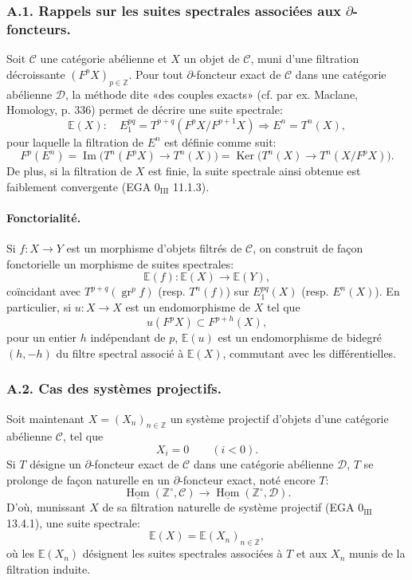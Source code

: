 \documentclass[11pt]{article}
\DeclareMathOperator{\Hom}{Hom}
\providecommand{\Ker}{\operatorname{Ker}}
\providecommand{\uHom}{\underline{\Hom}}
\providecommand{\gr}{\operatorname{gr}}
\providecommand{\Hom}{\operatorname{Hom}}
\providecommand{\Im}{\operatorname{Im}}
\providecommand{\Ker}{\operatorname{Ker}}
\providecommand{\gr}{\operatorname{gr}}
\renewcommand{\Im}{\operatorname{Im}}
\providecommand{\gr}{\operatorname{gr}}
\providecommand{\Ker}{\operatorname{Ker}}
\providecommand{\Im}{\operatorname{Im}}
\providecommand{\Hom}{\operatorname{Hom}}
\begin{document}
\subsubsection*{A.1. Rappels sur les suites spectrales associées aux \(\partial\)-foncteurs.}

Soit \(\mathcal C\) une catégorie abélienne et \(X\) un objet de \(\mathcal C\), muni d'une filtration décroissante \((F^pX)_{p\in\mathbb Z}\). Pour tout \(\partial\)-foncteur exact de \(\mathcal C\) dans une catégorie abélienne \(\mathcal D\), la méthode dite «des couples exacts» (cf. par ex. Maclane, Homology, p. 336) permet de décrire une suite spectrale:
\[
\mathbb{E}(X):\quad E_1^{pq}=T^{p+q}(F^pX/F^{p+1}X)\Rightarrow E^n=T^n(X),
\]
pour laquelle la filtration de \(E^n\) est définie comme suit:
\[
F^p(E^n)=\Im\bigl(T^n(F^pX)\longrightarrow T^n(X)\bigr)
=\Ker\bigl(T^n(X)\longrightarrow T^n(X/F^pX)\bigr).
\]
De plus, si la filtration de \(X\) est finie, la suite spectrale ainsi obtenue est faiblement convergente (EGA \(0_{\mathrm{III}}\) 11.1.3).

\paragraph{Fonctorialité.}
Si \(f:X\to Y\) est un morphisme d'objets filtrés de \(\mathcal C\), on construit de façon fonctorielle un morphisme de suites spectrales:
\[
\mathbb{E}(f):\mathbb{E}(X)\longrightarrow \mathbb{E}(Y),
\]
coïncidant avec \(T^{p+q}(\gr^p f)\) (resp. \(T^n(f)\)) sur \(E_1^{pq}(X)\) (resp. \(E^n(X)\)). En particulier, si \(u:X\to X\) est un endomorphisme de \(X\) tel que
\[
u(F^pX)\subset F^{p+h}(X),
\]
pour un entier \(h\) indépendant de \(p\), \(\mathbb{E}(u)\) est un endomorphisme de bidegré \((h,-h)\) du filtre spectral associé à \(\mathbb{E}(X)\), commutant avec les différentielles.

\subsubsection*{A.2. Cas des systèmes projectifs.}
Soit maintenant \(X=(X_n)_{n\in\mathbb Z}\) un système projectif d'objets d'une catégorie abélienne \(\mathcal C\), tel que
\[
X_i=0\qquad(i<0).
\]
Si \(T\) désigne un \(\partial\)-foncteur exact de \(\mathcal C\) dans une catégorie abélienne \(\mathcal D\), \(T\) se prolonge de façon naturelle en un \(\partial\)-foncteur exact, noté encore \(T\):
\[
\uHom(\mathbb Z^\circ,\mathcal C)\longrightarrow \uHom(\mathbb Z^\circ,\mathcal D).
\]
D'où, munissant \(X\) de sa filtration naturelle de système projectif (EGA \(0_{\mathrm{III}}\) 13.4.1), une suite spectrale:
\[
\mathbb{E}(X)=\mathbb{E}(X_n)_{n\in\mathbb Z},
\]
où les \(\mathbb{E}(X_n)\) désignent les suites spectrales associées à \(T\) et aux \(X_n\) munis de la filtration induite.
\end{document}
